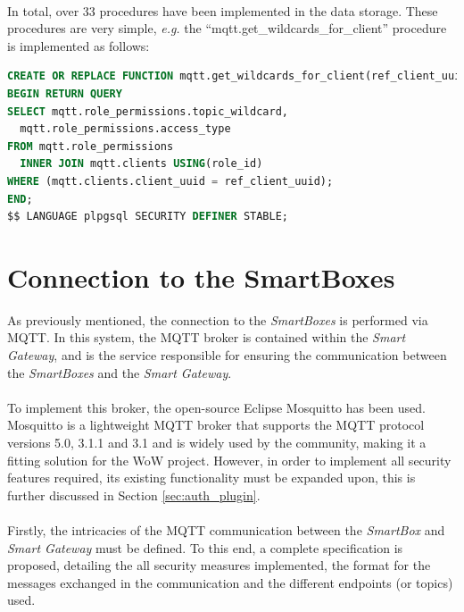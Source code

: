 \paragraph{} In total, over 33 procedures have been implemented in the data storage. These procedures are very simple, \textit{e.g.} the ``mqtt.get\_wildcards\_for\_client'' procedure is implemented as follows:

\begin{lstlisting}[language=sql]     
CREATE OR REPLACE FUNCTION mqtt.get_wildcards_for_client(ref_client_uuid uuid) RETURNS TABLE (topic_wildcard text, access_type int) AS $$ 
BEGIN RETURN QUERY
SELECT mqtt.role_permissions.topic_wildcard,
  mqtt.role_permissions.access_type
FROM mqtt.role_permissions
  INNER JOIN mqtt.clients USING(role_id)
WHERE (mqtt.clients.client_uuid = ref_client_uuid);
END;
$$ LANGUAGE plpgsql SECURITY DEFINER STABLE;
\end{lstlisting}

\section{Connection to the SmartBoxes}


As previously mentioned, the connection to the \textit{SmartBoxes} is performed via \acs{MQTT}. In this system, the \acs{MQTT} broker is contained within the \textit{Smart Gateway}, and is the service responsible for ensuring the communication between the \textit{SmartBoxes} and the \textit{Smart Gateway}.

\paragraph{} To implement this broker, the open-source Eclipse Mosquitto \cite{mosquitto} has been used. Mosquitto is a lightweight \acs{MQTT} broker that supports the \acs{MQTT} protocol versions 5.0, 3.1.1 and 3.1 and is widely used by the community, making it a fitting solution for the \acs{WoW} project. However, in order to implement all security features required, its existing functionality must be expanded upon, this is further discussed in Section \ref{sec:auth_plugin}.

\paragraph{} Firstly, the intricacies of the \acs{MQTT} communication between the \textit{SmartBox} and \textit{Smart Gateway} must be defined. To this end, a complete specification is proposed, detailing the all security measures implemented, the format for the messages exchanged in the communication and the different endpoints (or topics) used. 

